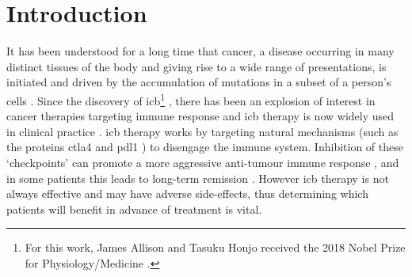 \documentclass[12pt]{article}
\begin{document}

\section{Introduction}
It has been understood for a long time that cancer, a disease occurring in many distinct tissues of the body and giving rise to a wide range of presentations, is initiated and driven by the accumulation of mutations in a subset of a person's cells \citep{boveri_concerning_2008}.  Since the discovery of \acrfull{icb}\footnote{For this work, James Allison and Tasuku Honjo received the 2018 Nobel Prize for Physiology/Medicine \citep{ledford_cancer_2018}.}  \citep{ishida_induced_1992,leach_enhancement_1996},  there has been an explosion of interest in cancer therapies targeting immune response and \acrshort{icb} therapy is now widely used in clinical practice \citep{robert_decade_2020}.  \acrshort{icb} therapy works by targeting natural mechanisms (such as the proteins \acrfull{ctla4} and \acrfull{pdl1} \citep{buchbinder_ctla-4_2016}) to disengage the immune system. Inhibition of these `checkpoints' can promote a more aggressive anti-tumour immune response \cite{pardoll_blockade_2012}, and in some patients this leads to long-term remission \citep{gettinger_5-year_2019}. However \acrshort{icb} therapy is not always effective \citep{nowicki_mechanisms_2018} and may have adverse side-effects, thus determining which patients will benefit in advance of treatment is vital. 


\end{document}
